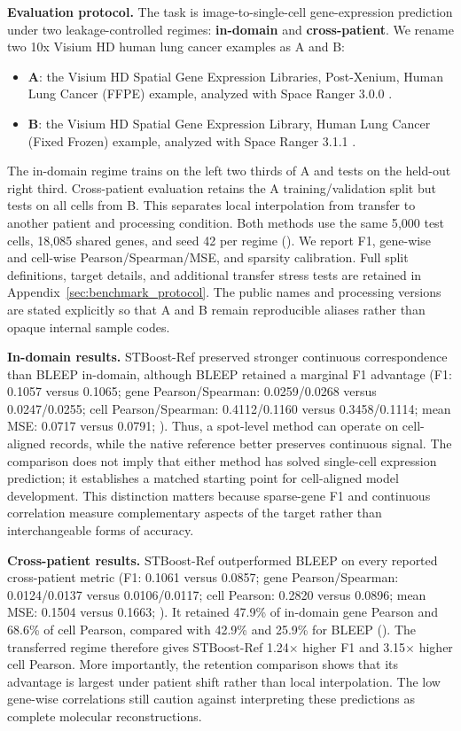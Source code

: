 \documentclass[sigconf,review]{acmart}
\begin{document}
\noindent\textbf{Evaluation protocol.}
The task is image-to-single-cell gene-expression prediction under two
leakage-controlled regimes: \textbf{in-domain} and \textbf{cross-patient}. We
rename two 10x Visium HD human lung cancer examples as A and B:
\begin{itemize}[leftmargin=1.4em,itemsep=0pt,topsep=2pt,parsep=0pt]
    \item \textbf{A}: the Visium HD Spatial Gene Expression Libraries, Post-Xenium, Human Lung Cancer (FFPE) example, analyzed with Space Ranger 3.0.0 \cite{tenx_visium_hd_postx_lung_ffpe}.
    \item \textbf{B}: the Visium HD Spatial Gene Expression Library, Human Lung Cancer (Fixed Frozen) example, analyzed with Space Ranger 3.1.1 \cite{tenx_visium_hd_lung_fixed_frozen}.
\end{itemize}
The in-domain regime trains on the left two thirds of A and tests on the held-out
right third. Cross-patient evaluation retains the A training/validation split
but tests on all cells from B. This separates local interpolation from transfer
to another patient and processing condition. Both methods use the same 5{,}000
test cells, 18{,}085 shared genes, and seed 42 per regime
(). We report F1, gene-wise and cell-wise
Pearson/Spearman/MSE, and sparsity calibration. Full split definitions, target
details, and additional transfer stress tests are retained in
Appendix~\ref{sec:benchmark_protocol}.
The public names and processing versions are stated explicitly so that A and B
remain reproducible aliases rather than opaque internal sample codes.


\noindent\textbf{In-domain results.}
STBoost-Ref preserved stronger continuous correspondence than BLEEP in-domain,
although BLEEP retained a marginal F1 advantage (F1: 0.1057 versus 0.1065;
gene Pearson/Spearman: 0.0259/0.0268 versus 0.0247/0.0255; cell
Pearson/Spearman: 0.4112/0.1160 versus 0.3458/0.1114; mean MSE: 0.0717 versus
0.0791; ). Thus, a spot-level method can operate on
cell-aligned records, while the native reference better preserves continuous
signal. The comparison does not imply that either method has solved
single-cell expression prediction; it establishes a matched starting point for
cell-aligned model development.
This distinction matters because sparse-gene F1 and continuous correlation
measure complementary aspects of the target rather than interchangeable forms
of accuracy.

\noindent\textbf{Cross-patient results.}
STBoost-Ref outperformed BLEEP on every reported cross-patient metric (F1:
0.1061 versus 0.0857; gene Pearson/Spearman: 0.0124/0.0137 versus
0.0106/0.0117; cell Pearson: 0.2820 versus 0.0896; mean MSE: 0.1504 versus
0.1663; ). It retained 47.9\% of in-domain gene Pearson and
68.6\% of cell Pearson, compared with 42.9\% and 25.9\% for BLEEP
(). The transferred regime therefore gives STBoost-Ref
1.24$\times$ higher F1 and 3.15$\times$ higher cell Pearson. More importantly,
the retention comparison shows that its advantage is largest under patient
shift rather than local interpolation.
The low gene-wise correlations still caution against interpreting these
predictions as complete molecular reconstructions.
\end{document}
